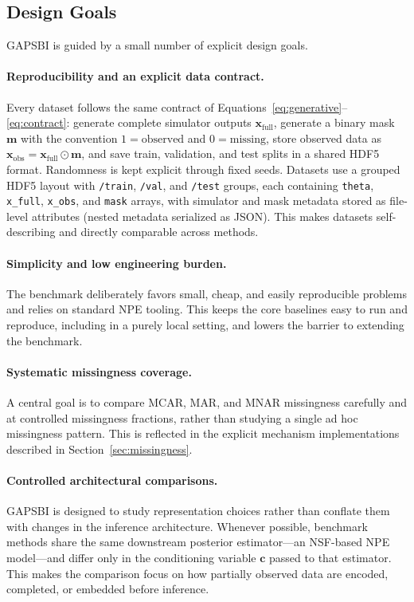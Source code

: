 \documentclass{article} %
\providecommand{\xfull}{\mathbf{x}_{\mathrm{full}}}
\providecommand{\xobs}{\mathbf{x}_{\mathrm{obs}}}
\providecommand{\mvec}{\mathbf{m}}
\begin{document}
\subsection{Design Goals}
\label{sec:design-goals}

GAPSBI is guided by a small number of explicit design goals.

\paragraph{Reproducibility and an explicit data contract.} Every dataset follows
the same contract of Equations~\eqref{eq:generative}--\eqref{eq:contract}:
generate complete simulator outputs $\xfull$, generate a binary mask $\mvec$ with
the convention $1 = \text{observed}$ and $0 = \text{missing}$, store observed data
as $\xobs = \xfull \odot \mvec$, and save train, validation, and test splits in a
shared HDF5 format. Randomness is kept explicit through fixed seeds. Datasets use
a grouped HDF5 layout with \texttt{/train}, \texttt{/val}, and \texttt{/test}
groups, each containing \texttt{theta}, \texttt{x\_full}, \texttt{x\_obs}, and
\texttt{mask} arrays, with simulator and mask metadata stored as file-level
attributes (nested metadata serialized as JSON). This makes datasets
self-describing and directly comparable across methods.

\paragraph{Simplicity and low engineering burden.} The benchmark deliberately
favors small, cheap, and easily reproducible problems and relies on standard NPE
tooling. This keeps the core baselines easy to run and reproduce, including in a
purely local setting, and lowers the barrier to extending the benchmark.

\paragraph{Systematic missingness coverage.} A central goal is to compare MCAR,
MAR, and MNAR missingness carefully and at controlled missingness fractions,
rather than studying a single ad hoc missingness pattern. This is reflected in
the explicit mechanism implementations described in
Section~\ref{sec:missingness}.

\paragraph{Controlled architectural comparisons.} GAPSBI is designed to study
representation choices rather than conflate them with changes in the inference
architecture. Whenever possible, benchmark methods share the same downstream
posterior estimator---an NSF-based NPE model---and differ only in the
conditioning variable $\mathbf{c}$ passed to that estimator. This makes the
comparison focus on how partially observed data are encoded, completed, or
embedded before inference.
\end{document}
